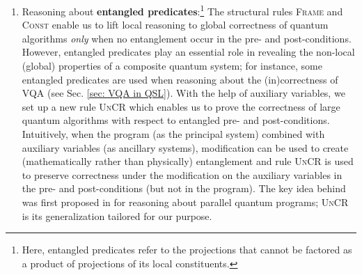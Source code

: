 \documentclass[conference,compsoc, 10pt]{IEEEtran}
\newcommand{\jh}[1]{\textit{\color{red}[JH] : #1}}
\newcommand{\lz}[1]{\textit{\color{blue}[LZ] : #1}}
\providecommand{\todo}[1]{{\protect\color{red}\noindent {\bf [todo]}\emph{#1} {\bf [/todo]}}}
\begin{document}
\begin{enumerate}
	\item 
		Reasoning about \textbf{entangled predicates}:\footnote{Here, entangled predicates refer to the projections that cannot be factored as a product of projections of its local constituents.} The structural rules \textsc{Frame} and \textsc{Const} enable us to lift local reasoning to global correctness of quantum algorithms \textit{only} when no entanglement occur in the pre- and post-conditions.
      However, entangled predicates play an essential role in revealing the non-local (global) properties of a composite quantum system; for instance, some entangled predicates are used when reasoning about the (in)correctness of VQA (see Sec. \ref{sec: VQA in QSL}).
		With the help of auxiliary variables, we set up a new rule \textsc{UnCR} which enables us to prove the correctness of large quantum algorithms with respect to entangled pre- and post-conditions.
		Intuitively, when the program (as the principal system) combined with auxiliary variables (as ancillary systems), modification can be used to create (mathematically rather than physically) entanglement and rule \textsc{UnCR} is used to preserve correctness under the modification on the auxiliary variables in the pre- and post-conditions (but not in the program). The key idea behind was first proposed in \cite{YZL18} for reasoning about parallel quantum programs;  \textsc{UnCR} is its generalization tailored for our purpose.		
	\end{enumerate}
	
\end{document}
